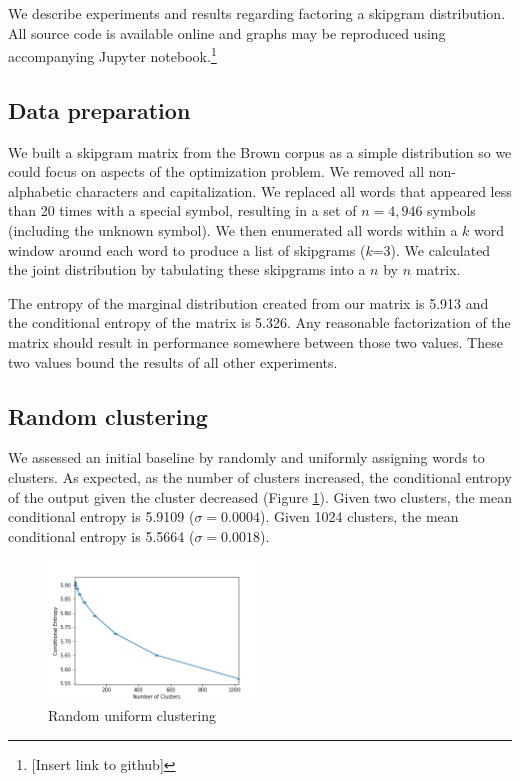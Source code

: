 \documentclass[11pt,letterpaper]{article}
\begin{document}
We describe experiments and results regarding factoring a skipgram distribution. All source code is available online and graphs may be reproduced using accompanying Jupyter notebook.\footnote{[Insert link to github]}

\subsection{Data preparation}

We built a skipgram matrix from the Brown corpus as a simple distribution so we could focus on aspects of the optimization problem. We removed all non-alphabetic characters and capitalization. We replaced all words that appeared less than 20 times with a special symbol, resulting in a set of $n=4,946$ symbols (including the unknown symbol). We then enumerated all words within a $k$ word window around each word to produce a list of skipgrams ($k$=3). We calculated the joint distribution by tabulating these skipgrams into a $n$ by $n$ matrix.

The entropy of the marginal distribution created from our matrix is 5.913 and the conditional entropy of the matrix is 5.326. Any reasonable factorization of the matrix should result in performance somewhere between those two values. These two values bound the results of all other experiments.

\subsection{Random clustering}

We assessed an initial baseline by randomly and uniformly assigning words to clusters. As expected, as the number of clusters increased, the conditional entropy of the output given the cluster decreased (Figure \ref{f:random}). Given two clusters, the mean conditional entropy is 5.9109 ($\sigma=0.0004$). Given 1024 clusters, the mean conditional entropy is 5.5664 ($\sigma=0.0018$).

\begin{figure}
  \caption{Random uniform clustering}
\label{f:random}
  \centering
    \includegraphics[width=0.5\textwidth]{random.png}
\end{figure}
\end{document}
